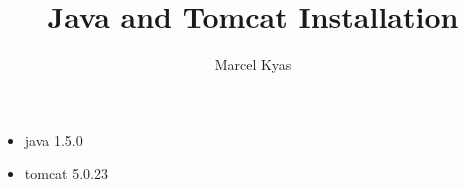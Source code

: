 \documentclass[a4paper,11pt]{article}
\title{Java and Tomcat Installation}
\author{Marcel Kyas}
\begin{document}
\begin{itemize}
\item java 1.5.0
\item tomcat 5.0.23
\end{itemize}
\end{document}
